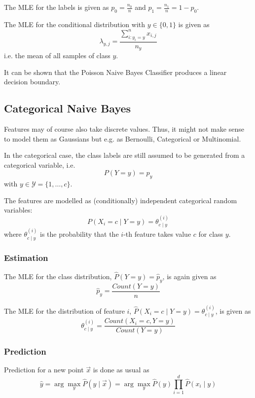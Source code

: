 The MLE for the labels is given as
$p_0 = \frac{n_0}{n}$
and $p_1 = \frac{n_1}{n} = 1 - p_0$.

The MLE for the conditional distribution
with $y \in \{0,1\}$ is given as
\begin{equation*}
    \lambda_{y,j} = \frac{
    \sum_{i: y_i = y}^n{x_{i,j}}
    }{n_y}
\end{equation*}
i.e. the mean of all samples of class $y$.

It can be shown that the Poisson Naive Bayes Classifier
produces a linear decision boundary.


\subsection{Categorical Naive Bayes}
Features may of course also take discrete values.
Thus, it might not make sense to model
them as Gaussians but e.g. as
Bernoulli, Categorical or Multinomial.

In the categorical case,
the class labels are still assumed to
be generated from a categorical variable, i.e.
\begin{equation*}
    P(Y = y) = p_y
\end{equation*}
with $y \in \mathcal{Y} = \{1, \dotsc, c\}$.

The features are modelled as (conditionally)
independent categorical random variables:
\begin{equation*}
    P(X_i = c \mid Y = y) = \theta^{(i)}_{c \mid y}
\end{equation*}
where $\theta^{(i)}_{c \mid y}$ is the
probability that the $i$-th feature
takes value $c$ for class $y$.

\subsubsection{Estimation}
The MLE for the class distribution,
$\hat{P}(Y = y) = \hat{p}_y$,
is again given as
\begin{equation*}
    \hat{p}_y = \frac{Count(Y = y)}{n}
\end{equation*}

The MLE for the distribution of feature $i$,
$\hat{P}(X_i = c \mid Y = y) = \theta^{(i)}_{c \mid y}$,
is given as
\begin{equation*}
    \theta^{(i)}_{c \mid y} =
    \frac{Count(X_i = c, Y = y)}{Count(Y = y)}
\end{equation*}

\subsubsection{Prediction}
Prediction for a new point $\vec{x}$ is
done as usual as
\begin{equation*}
    \hat{y} = \arg\max_y{\hat{P}(y \mid \vec{x})}
    = \arg\max_y{
        \hat{P}(y) \prod_{i=1}^d{\hat{P}(x_i \mid y)}
    }
\end{equation*}

